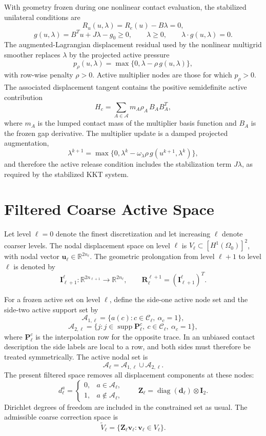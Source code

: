 \documentclass[11pt]{article}
\newcommand{\R}{\mathbb{R}}
\newcommand{\calA}{\mathcal{A}}
\newcommand{\calC}{\mathcal{C}}
\newcommand{\ud}{\boldsymbol{u}}
\newcommand{\vv}{\boldsymbol{v}}
\newcommand{\II}{\boldsymbol{I}}
\newcommand{\RR}{\boldsymbol{R}}
\newcommand{\ZZ}{\boldsymbol{Z}}
\newcommand{\PP}{\boldsymbol{P}}
\newcommand{\dd}{\boldsymbol{d}}
\newcommand{\diag}{\operatorname{diag}}
\newcommand{\supp}{\operatorname{supp}}
\begin{document}
With geometry frozen during one nonlinear contact evaluation, the stabilized
unilateral conditions are
\[
    R_u(u,\lambda)=R_e(u)-B\lambda=0,
\]
\[
    g(u,\lambda)=B^T u+J\lambda-g_0\ge 0,
    \qquad
    \lambda\ge 0,
    \qquad
    \lambda\cdot g(u,\lambda)=0 .
\]
The augmented-Lagrangian displacement residual used by the nonlinear
multigrid smoother replaces $\lambda$ by the projected active pressure
\[
    p_\rho(u,\lambda)
    =
    \max\{0,\lambda-\rho\,g(u,\lambda)\},
\]
with row-wise penalty $\rho>0$.  Active multiplier nodes are those for which
$p_\rho>0$.  The associated displacement tangent contains the positive
semidefinite active contribution
\[
    H_c
    =
    \sum_{A\in\calA}
    m_A\rho_A\,B_A B_A^T ,
\]
where $m_A$ is the lumped contact mass of the multiplier basis function and
$B_A$ is the frozen gap derivative.  The multiplier update is a damped
projected augmentation,
\[
    \lambda^{k+1}
    =
    \max\{0,\lambda^k-\omega_\lambda\rho\,g(u^{k+1},\lambda^k)\},
\]
and therefore the active release condition includes the stabilization term
$J\lambda$, as required by the stabilized KKT system.

\section{Filtered Coarse Active Space}
\label{sec:filtered-space}

Let level $\ell=0$ denote the finest discretization and let increasing
$\ell$ denote coarser levels.  The nodal displacement space on level $\ell$ is
$V_\ell\subset [H^1(\Omega_0)]^2$, with nodal vector
$\ud_\ell\in\R^{2n_\ell}$.  The geometric prolongation from level $\ell+1$ to
level $\ell$ is denoted by
\[
    \II_{\ell+1}^{\ell}:\R^{2n_{\ell+1}}\to\R^{2n_\ell},
    \qquad
    \RR_{\ell}^{\ell+1}=(\II_{\ell+1}^{\ell})^T .
\]

For a frozen active set on level $\ell$, define the side-one active node set
and the side-two active support set by
\[
    \calA_{1,\ell}
    =
    \{a(c):c\in\calC_\ell,\ \alpha_c=1\},
\]
\[
    \calA_{2,\ell}
    =
    \{j:j\in\supp \PP_\ell^c,\ c\in\calC_\ell,\ \alpha_c=1\},
\]
where $\PP_\ell^c$ is the interpolation row for the opposite trace.  In an
unbiased contact description the side labels are local to a row, and both
sides must therefore be treated symmetrically.  The active nodal set is
\[
    \calA_\ell = \calA_{1,\ell}\cup\calA_{2,\ell}.
\]
The present filtered space removes all displacement components at these
nodes:
\[
    d_\ell^a =
    \begin{cases}
    0, & a\in\calA_\ell,\\
    1, & a\notin\calA_\ell,
    \end{cases}
    \qquad
    \ZZ_\ell=\diag(\dd_\ell)\otimes \II_2 .
\]
Dirichlet degrees of freedom are included in the constrained set as usual.
The admissible coarse correction space is
\[
    \widetilde V_\ell
    =
    \{\ZZ_\ell\vv_\ell:\vv_\ell\in V_\ell\}.
\]
\end{document}
